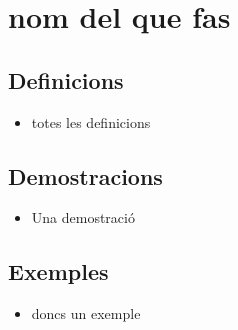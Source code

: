 \section{nom del que fas}
\subsection*{Definicions}
\begin{itemize}
\item totes les definicions
\end{itemize}

\subsection*{Demostracions}
\begin{itemize}
\item Una demostració
\end{itemize}

\subsection*{Exemples}
\begin{itemize}
\item doncs un exemple
\end{itemize}

